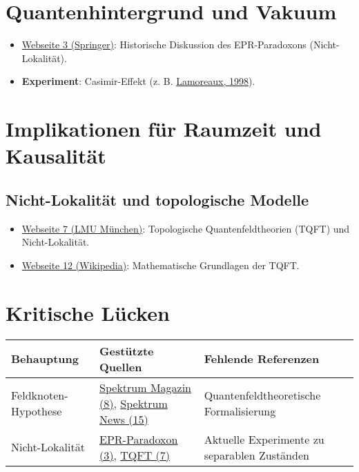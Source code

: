 \documentclass[12pt,a4paper]{article}
\begin{document}
	\section{Quantenhintergrund und Vakuum}
	\begin{itemize}
		\item \href{https://link.springer.com/article/10.1007/BF02731765}{Webseite 3 (Springer)}: Historische Diskussion des EPR-Paradoxons (Nicht-Lokalität).
		\item \textbf{Experiment}: Casimir-Effekt (z. B. \href{https://doi.org/10.1103/PhysRevLett.81.4549}{Lamoreaux, 1998}).
	\end{itemize}
	
	\section{Implikationen für Raumzeit und Kausalität}
	\subsection{Nicht-Lokalität und topologische Modelle}
	\begin{itemize}
		\item \href{https://www.mathematik.uni-muenchen.de/~schotten/tqa/tqa_research_tftq.php}{Webseite 7 (LMU München)}: Topologische Quantenfeldtheorien (TQFT) und Nicht-Lokalität.
		\item \href{https://de.wikipedia.org/wiki/Topologische_Quantenfeldtheorie}{Webseite 12 (Wikipedia)}: Mathematische Grundlagen der TQFT.
	\end{itemize}
	
	\section{Kritische Lücken}
	\begin{tabularx}{\textwidth}{|l|X|X|}
		\hline
		\textbf{Behauptung} & \textbf{Gestützte Quellen} & \textbf{Fehlende Referenzen} \\
		\hline
		Feldknoten-Hypothese & 
		\href{https://www.spektrum.de/magazin/feldknoten-als-teilchen/986518}{Spektrum Magazin (8)}, 
		\href{https://www.spektrum.de/news/feldknoten-als-teilchen/981803}{Spektrum News (15)} & 
		Quantenfeldtheoretische Formalisierung \\
		\hline
		Nicht-Lokalität & 
		\href{https://link.springer.com/article/10.1007/BF02731765}{EPR-Paradoxon (3)}, 
		\href{https://www.mathematik.uni-muenchen.de/~schotten/tqa/tqa_research_tftq.php}{TQFT (7)} & 
		Aktuelle Experimente zu separablen Zuständen \\
		\hline
	\end{tabularx}
	
\end{document}
